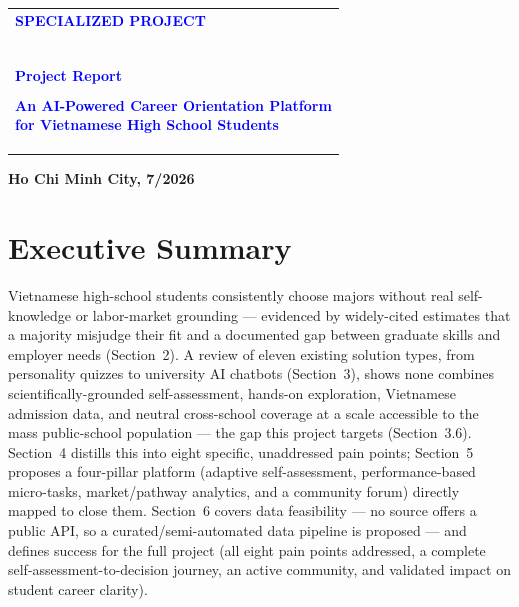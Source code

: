 \documentclass[a4paper]{article}
\begin{document}
\begin{titlepage}
\vspace{1cm}


\begin{center}
\begin{tabular}{@{}p{\textwidth}@{}}
	\textbf{{\Large \textcolor{blue}{SPECIALIZED PROJECT}}}\\
	~~\\
	\arrayrulecolor{blue}\hline
	\\
	\textbf{{\Large \textcolor{blue}{Project Report}}}\\
	\\

	{\centering\textbf{{\huge \textcolor{blue}{An AI-Powered Career Orientation Platform\\[8pt]
	for Vietnamese High School Students}}}\par}\\
	\\

	\arrayrulecolor{blue}\hline \\ \\

\end{tabular}
\end{center}

\vspace{6cm}


\begin{center}
{\textbf{\Large Ho Chi Minh City, 7/2026}}
\end{center}
\end{titlepage}

\thispagestyle{empty}
\setcounter{page}{0}
\newpage
\tableofcontents
\newpage


\section*{Executive Summary}

Vietnamese high-school students consistently choose majors without real self-knowledge or
labor-market grounding --- evidenced by widely-cited estimates that a majority misjudge their
fit and a documented gap between graduate skills and employer needs (Section~2). A review of
eleven existing solution types, from personality quizzes to university AI chatbots (Section~3),
shows none combines scientifically-grounded self-assessment, hands-on exploration, Vietnamese
admission data, and neutral cross-school coverage at a scale accessible to the mass
public-school population --- the gap this project targets (Section~3.6). Section~4 distills
this into eight specific, unaddressed pain points; Section~5 proposes a four-pillar platform
(adaptive self-assessment, performance-based micro-tasks, market/pathway analytics, and a
community forum) directly mapped to close them. Section~6 covers data feasibility --- no
source offers a public API, so a curated/semi-automated data pipeline is proposed --- and
defines success for the full project (all eight pain points addressed, a complete
self-assessment-to-decision journey, an active community, and validated impact on student
career clarity).
\end{document}
